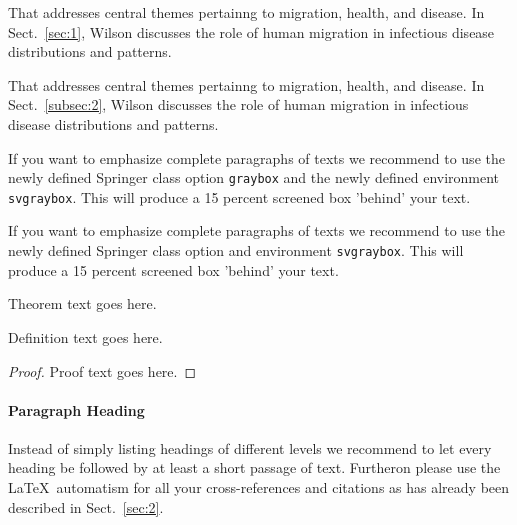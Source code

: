 \begin{description}[Type 1]
    \item[Type 1]{That addresses central themes pertainng to migration, health, and disease. In Sect.~\ref{sec:1}, Wilson discusses the role of human migration in infectious disease distributions and patterns.}
    \item[Type 2]{That addresses central themes pertainng to migration, health, and disease. In Sect.~\ref{subsec:2}, Wilson discusses the role of human migration in infectious disease distributions and patterns.}
\end{description}

\begin{svgraybox}
    If you want to emphasize complete paragraphs of texts we recommend to use the newly defined Springer class option \verb|graybox| and the newly defined environment \verb|svgraybox|. This will produce a 15 percent screened box 'behind' your text.

    If you want to emphasize complete paragraphs of texts we recommend to use the newly defined Springer class option and environment \verb|svgraybox|. This will produce a 15 percent screened box 'behind' your text.
\end{svgraybox}

\begin{theorem}
    Theorem text goes here.
\end{theorem}

\begin{definition}
    Definition text goes here.
\end{definition}

\begin{proof}
    Proof text goes here.
\end{proof}

\paragraph{Paragraph Heading} %
Instead of simply listing headings of different levels we recommend to let every heading be followed by at least a short passage of text. Furtheron please use the \LaTeX\ automatism for all your cross-references and citations as has already been described in Sect.~\ref{sec:2}.

